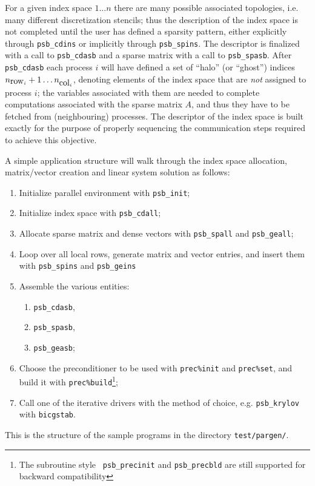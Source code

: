 For  a given index space $1\dots n$ there are many possible associated
topologies, i.e. many different discretization stencils; thus the
description of the index space is not completed until the user has
defined a sparsity pattern, either explicitly through \verb|psb_cdins|
or implicitly through \verb|psb_spins|. The descriptor is finalized
with a call to \verb|psb_cdasb| and a sparse matrix with a call to
\verb|psb_spasb|. After \verb|psb_cdasb| each process $i$ will have
defined a set of ``halo'' (or ``ghost'') indices
$n_{\hbox{row}_i}+1\dots n_{\hbox{col}_i}$, denoting elements of the index
space that are \emph{not} assigned to process $i$; the
variables associated with them are needed to complete computations
associated with the sparse matrix $A$, and thus they have to be
fetched from (neighbouring) processes. The descriptor of the index
space is built exactly for the purpose of properly sequencing the
communication steps required to achieve this objective. 

A simple application structure will walk through the index space
allocation, matrix/vector creation and linear system solution as
follows:
\begin{enumerate}
\item Initialize parallel environment with \verb|psb_init|;
\item Initialize index space with \verb|psb_cdall|;
\item Allocate sparse matrix and dense vectors with \verb|psb_spall|
  and \verb|psb_geall|;
\item Loop over all local rows, generate matrix and vector entries,
  and insert them with \verb|psb_spins| and \verb|psb_geins|
\item Assemble the various entities: 
\begin{enumerate}
\item \verb|psb_cdasb|,
\item \verb|psb_spasb|,
\item \verb|psb_geasb|;
\end{enumerate}
\item Choose the preconditioner to be used with \verb|prec%init| and
  \verb|prec%set|,  and
  build it with \verb|prec%build|\footnote{The subroutine style {\tt
      psb\_precinit} and {\tt psb\_precbld} are still supported for
    backward compatibility};
\item Call one of the iterative drivers with the method of
  choice, e.g. \verb|psb_krylov| with \verb|bicgstab|.
\end{enumerate}
This is the structure of the sample programs in the directory 
\verb|test/pargen/|. 

